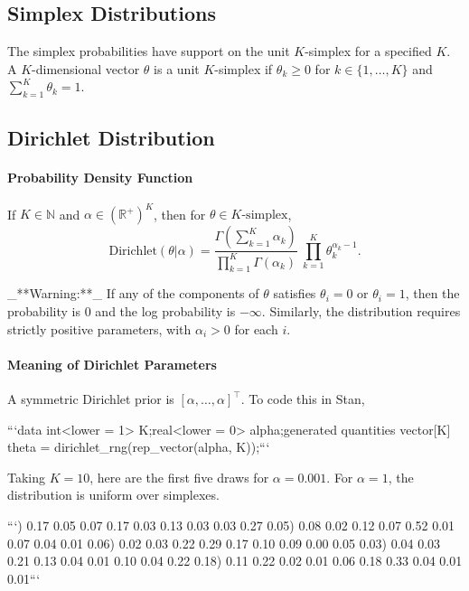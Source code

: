 \begin{description}
\chapter{Simplex Distributions}


The simplex probabilities have support on the unit $K$-simplex for a specified $K$.  A $K$-dimensional vector $\theta$ is a unit $K$-simplex if $\theta_k \geq 0$ for $k \in \{1,\ldots,K\}$ and $\sum_{k = 1}^K \theta_k = 1$.


\section{Dirichlet Distribution}


\subsubsection{Probability Density Function}


If $K \in \mathbb{N}$ and $\alpha \in (\mathbb{R}^+)^{K}$, then for $\theta \in \text{$K$-simplex}$, \[ \text{Dirichlet}(\theta|\alpha) = \frac{\Gamma \! \left( \sum_{k=1}^K \alpha_k \right)}      {\prod_{k=1}^K \Gamma(\alpha_k)} \ \prod_{k=1}^K \theta_k^{\alpha_k - 1} . \] 

 _**Warning:**_  If any of the components of $\theta$ satisfies $\theta_i = 0$ or $\theta_i = 1$, then the probability is 0 and the log probability is $-\infty$.  Similarly, the distribution requires strictly positive parameters, with $\alpha_i > 0$ for each $i$.


\subsubsection{Meaning of Dirichlet Parameters}


A symmetric Dirichlet prior is $[\alpha, \ldots, \alpha]^{\top}$.  To code this in Stan,


```\n data {\n   int<lower = 1> K;\n   real<lower = 0> alpha;\n }\n generated quantities {\n   vector[K] theta = dirichlet_rng(rep_vector(alpha, K));\n }\n ```


Taking $K = 10$, here are the first five draws for $\alpha = 0.001$. For $\alpha = 1$, the distribution is uniform over simplexes.


```) 0.17 0.05 0.07 0.17 0.03 0.13 0.03 0.03 0.27 0.05) 0.08 0.02 0.12 0.07 0.52 0.01 0.07 0.04 0.01 0.06) 0.02 0.03 0.22 0.29 0.17 0.10 0.09 0.00 0.05 0.03) 0.04 0.03 0.21 0.13 0.04 0.01 0.10 0.04 0.22 0.18) 0.11 0.22 0.02 0.01 0.06 0.18 0.33 0.04 0.01 0.01\n ```



\end{description}

